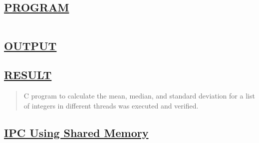 \documentclass[a4paper, 12pt]{article}
\begin{document}
\subsection*{\underline{PROGRAM}}
\begin{quote}
\inputminted[fontsize=\small,breaklines,breakanywhere]{c}{multithreaded_statistics.c}
\end{quote}

\newpage
\subsection*{\underline{OUTPUT}}

\begin{figure}[H] 
    \centering
\end{figure}


\subsection*{\underline{RESULT}}
\begin{quote}
C program to calculate the mean, median, and standard deviation for a list of integers in different threads was executed and verified.
\end{quote}

\newpage
\begin{center}
\section*{\LARGE \textbf{\underline{IPC Using Shared Memory}}} 
\end{center}
\end{document}

